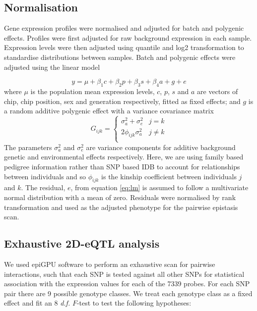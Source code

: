 \documentclass{article}
\begin{document}
\subsection{Normalisation}

Gene expression profiles were normalised and adjusted for batch and polygenic effects. Profiles were first adjusted for raw background expression in each sample. Expression levels were then adjusted using quantile and log2 transformation to standardise distributions between samples. Batch and polygenic effects were adjusted using the linear model

\begin{equation}
y = \mu + \beta_{1}c + \beta_{2}p + \beta_{3}s + \beta_{4}a + g + e
\label{eq:lm}
\end{equation}
where $\mu$ is the population mean expression levels, $c$, $p$, $s$ and $a$ are vectors of chip, chip position, sex and generation respectively, fitted as fixed effects; and $g$ is a random additive polygenic effect with a variance covariance matrix 
\begin{equation}
G_{ijk} = \left \{ 
\begin{array}{ll}
\sigma _a ^2 + \sigma _e ^2&        j = k \\ 
2\phi _{ijk} \sigma _a ^2& 			j \neq k \\
\end{array} \right.
\end{equation}
The parameters $\sigma_a^2$ and $\sigma_e^2$ are variance components for additive background genetic and environmental effects respectively. Here, we are using family based pedigree information rather than SNP based IDB to account for relationships between individuals and so $\phi _{ijk}$ is the kinship coefficient between individuals $j$ and $k$. The residual, $e$, from equation \ref{eq:lm} is assumed to follow a multivariate normal distribution with a mean of zero. Residuals were normalised by rank transformation and used as the adjusted phenotype for the pairwise epistasis scan. 


\subsection{Exhaustive 2D-eQTL analysis}

We used epiGPU software to perform an exhaustive scan for pairwise interactions, such that each SNP is tested against all other SNPs for statistical association with the expression values for each of the 7339 probes. For each SNP pair there are 9 possible genotype classes. We treat each genotype class as a fixed effect and fit an 8 \emph{d.f.} $F$-test to test the following hypotheses:
\end{document}

